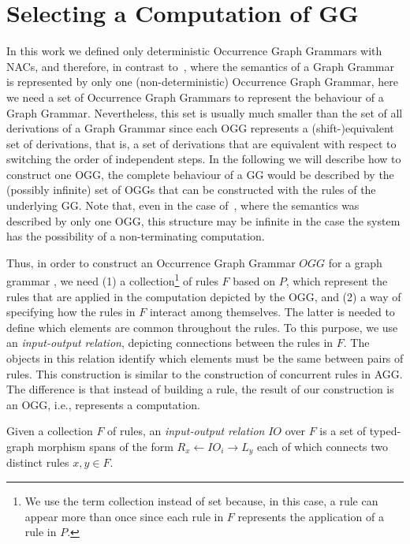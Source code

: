 \section{Selecting a Computation of GG}

  In this work we defined only deterministic Occurrence Graph Grammars with NACs, and therefore, in contrast to~\cite{Ribeiro1996}, where the semantics of a Graph Grammar is represented by only one (non-deterministic) Occurrence Graph Grammar, here we need a set of Occurrence Graph Grammars to represent the behaviour of a Graph Grammar.
  Nevertheless, this set is usually much smaller than the set of all derivations of a Graph Grammar since each OGG represents a (shift-)equivalent set of derivations, that is, a set of derivations that are equivalent with respect to switching the order of independent steps. 
  In the following we will describe how to construct one OGG, the complete behaviour of a GG would be described by the (possibly infinite) set of OGGs that can be constructed with the rules of the underlying GG. Note that, even in the case of~\cite{Ribeiro1996}, where the semantics was described by only one OGG, this structure may be  infinite in the case the system has the possibility of a non-terminating computation.

  Thus, in order to construct an Occurrence Graph Grammar $OGG$ for a graph grammar \graphGrammar{}, we need (1) a collection\footnote{ We use the term collection instead of set because, in this case, a rule can appear more than once since each rule in $F$ represents the application of a rule in $P$.} of rules $F$ based on $P$, which represent the rules that are applied in the computation depicted by the OGG, and (2) a way of specifying how the rules in $F$ interact among themselves. 
  The latter is needed to define which elements are common throughout the rules. To this purpose, we use an \emph{input-output relation}, depicting connections between the rules in $F$.
  The objects in this relation identify which elements must be the same between pairs of rules.
  This construction is similar to the construction of concurrent rules in AGG.
  The difference is that instead of building a rule, the result of our construction is an OGG, i.e., represents a computation.

\begin{definition} Given a collection $F$ of rules, an \emph{input-output relation} $IO$ over $F$ is a set of typed-graph morphism spans of the form \mbox{$R_x \leftarrow IO_i \rightarrow L_y$} each of which connects two distinct rules $x,y \in F$.
\end{definition}

